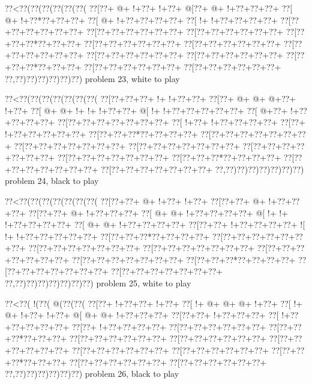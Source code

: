 \vbox{\vbox{\goo
\0??<\0??(\0??(\0??(\0??(\0??(\0??(
\0??[\0??+\- @+\- !+\0??+\- !+\0??+
\- @[\0??+\- @+\- !+\0??+\0??+\0??+
\0??[\- @+\- !+\0??*\0??+\0??+\0??+
\0??[\- @+\- !+\0??+\0??+\0??+\0??+
\0??[\- !+\- !+\0??+\0??+\0??+\0??+
\0??[\0??+\0??+\0??+\0??+\0??+\0??+
\0??[\0??+\0??+\0??+\0??+\0??+\0??+
\0??[\0??+\0??+\0??+\0??+\0??+\0??+
\0??[\0??+\0??+\0??*\0??+\0??+\0??+
\0??[\0??+\0??+\0??+\0??+\0??+\0??+
\0??[\0??+\0??+\0??+\0??+\0??+\0??+
\0??[\0??+\0??+\0??+\0??+\0??+\0??+
\0??[\0??+\0??+\0??+\0??+\0??+\0??+
\0??[\0??+\0??+\0??+\0??+\0??+\0??+
\0??[\0??+\0??+\0??*\0??+\0??+\0??+
\0??[\0??+\0??+\0??+\0??+\0??+\0??+
\0??[\0??+\0??+\0??+\0??+\0??+\0??+
\0??,\0??)\0??)\0??)\0??)\0??)\0??)
}
\hfil problem 23, white to play\hfil\break
}

\vbox{\vbox{\goo
\0??<\0??(\0??(\0??(\0??(\0??(\0??(\0??(
\0??[\0??+\0??+\0??+\- !+\- !+\0??+\0??+
\0??[\0??+\- @+\- @+\- @+\0??+\- !+\0??+
\0??[\- @+\- @+\- !+\- !+\- !+\0??+\0??+
\- @[\- !+\- !+\0??+\0??+\0??+\0??+\0??+
\0??[\- @+\0??+\- !+\0??+\0??+\0??+\0??+
\0??[\0??+\0??+\0??+\0??+\0??+\0??+\0??+
\0??[\- !+\0??+\- !+\0??+\0??+\0??+\0??+
\0??[\0??+\- !+\0??+\0??+\0??+\0??+\0??+
\0??[\0??+\0??+\0??*\0??+\0??+\0??+\0??+
\0??[\0??+\0??+\0??+\0??+\0??+\0??+\0??+
\0??[\0??+\0??+\0??+\0??+\0??+\0??+\0??+
\0??[\0??+\0??+\0??+\0??+\0??+\0??+\0??+
\0??[\0??+\0??+\0??+\0??+\0??+\0??+\0??+
\0??[\0??+\0??+\0??+\0??+\0??+\0??+\0??+
\0??[\0??+\0??+\0??*\0??+\0??+\0??+\0??+
\0??[\0??+\0??+\0??+\0??+\0??+\0??+\0??+
\0??[\0??+\0??+\0??+\0??+\0??+\0??+\0??+
\0??,\0??)\0??)\0??)\0??)\0??)\0??)\0??)
}
\hfil problem 24, black to play\hfil\break
}

\vbox{\vbox{\goo
\0??<\0??(\0??(\0??(\0??(\0??(\0??(\0??(
\0??[\0??+\0??+\- @+\- !+\0??+\- !+\0??+
\0??[\0??+\0??+\- @+\- !+\0??+\0??+\0??+
\0??[\0??+\0??+\- @+\- !+\0??+\0??+\0??+
\0??[\- @+\- @+\- !+\0??+\0??+\0??+\0??+
\- @[\- !+\- !+\- !+\0??+\0??+\0??+\0??+
\0??[\- @+\- @+\- !+\0??+\0??+\0??+\0??+
\0??[\0??+\0??+\- !+\0??+\0??+\0??+\0??+
\- ![\- !+\- !+\0??+\0??+\0??+\0??+\0??+
\0??[\0??+\0??+\0??*\0??+\0??+\0??+\0??+
\0??[\0??+\0??+\0??+\0??+\0??+\0??+\0??+
\0??[\0??+\0??+\0??+\0??+\0??+\0??+\0??+
\0??[\0??+\0??+\0??+\0??+\0??+\0??+\0??+
\0??[\0??+\0??+\0??+\0??+\0??+\0??+\0??+
\0??[\0??+\0??+\0??+\0??+\0??+\0??+\0??+
\0??[\0??+\0??+\0??*\0??+\0??+\0??+\0??+
\0??[\0??+\0??+\0??+\0??+\0??+\0??+\0??+
\0??[\0??+\0??+\0??+\0??+\0??+\0??+\0??+
\0??,\0??)\0??)\0??)\0??)\0??)\0??)\0??)
}
\hfil problem 25, white to play\hfil\break
}

\vbox{\vbox{\goo
\0??<\0??(\- !(\0??(\- @(\0??(\0??(
\0??[\0??+\- !+\0??+\0??+\- !+\0??+
\0??[\- !+\- @+\- @+\- @+\- !+\0??+
\0??[\- !+\- @+\- !+\0??+\- !+\0??+
\- @[\- @+\- @+\- !+\0??+\0??+\0??+
\0??[\0??+\0??+\- !+\0??+\0??+\0??+
\0??[\- !+\0??+\0??+\0??+\0??+\0??+
\0??[\0??+\- !+\0??+\0??+\0??+\0??+
\0??[\0??+\0??+\0??+\0??+\0??+\0??+
\0??[\0??+\0??+\0??*\0??+\0??+\0??+
\0??[\0??+\0??+\0??+\0??+\0??+\0??+
\0??[\0??+\0??+\0??+\0??+\0??+\0??+
\0??[\0??+\0??+\0??+\0??+\0??+\0??+
\0??[\0??+\0??+\0??+\0??+\0??+\0??+
\0??[\0??+\0??+\0??+\0??+\0??+\0??+
\0??[\0??+\0??+\0??*\0??+\0??+\0??+
\0??[\0??+\0??+\0??+\0??+\0??+\0??+
\0??[\0??+\0??+\0??+\0??+\0??+\0??+
\0??,\0??)\0??)\0??)\0??)\0??)\0??)
}
\hfil problem 26, black to play\hfil\break
}

